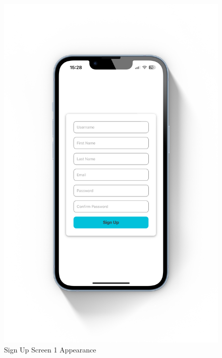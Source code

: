\begin{figure}[!ht]
    \centering
    \begin{minipage}{0.49\textwidth}
        \centering
        \includegraphics[scale=0.1]{LATEX/Appendices/Images/Software/Frontend/sign_up_screen_1.png}
        \caption{Sign Up Screen 1 Appearance}
        \label{fig:sign up screen 1}
    \end{minipage}\hfill %
    \begin{minipage}{0.49\textwidth}
         \centering

\end{minipage}
\end{figure}
